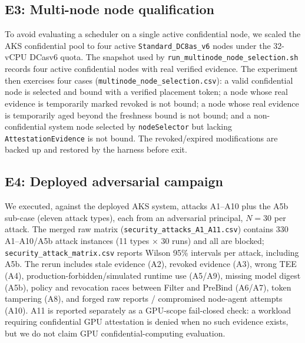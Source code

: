 \subsection{E3: Multi-node node qualification}
\label{sec:e3-multinode}
To avoid evaluating a scheduler on a single active confidential node, we scaled
the AKS confidential pool to four active \texttt{Standard\_DC8as\_v6} nodes under
the 32-vCPU DCasv6 quota. The snapshot used by
\texttt{run\_multinode\_node\_selection.sh} records four active confidential
nodes with real verified evidence. The experiment then exercises four cases
(\texttt{multinode\_node\_selection.csv}): a valid confidential node is selected
and bound with a verified placement token; a node whose real evidence is
temporarily marked revoked is not bound; a node whose real evidence is
temporarily aged beyond the freshness bound is not bound; and a non-confidential
system node selected by \texttt{nodeSelector} but lacking
\texttt{AttestationEvidence} is not bound. The revoked/expired modifications are
backed up and restored by the harness before exit.

\subsection{E4: Deployed adversarial campaign}
\label{sec:e2}
We executed, against the deployed AKS system, attacks A1--A10 plus the A5b
sub-case (eleven attack types), each from an adversarial principal, $N{=}30$
per attack. The merged raw matrix (\texttt{security\_attacks\_A1\_A11.csv})
contains 330 A1--A10/A5b attack instances (11 types $\times$ 30 runs) and all
are blocked; \texttt{security\_attack\_matrix.csv} reports Wilson 95\%
intervals per attack, including A5b. The rerun includes stale evidence (A2), revoked evidence
(A3), wrong TEE (A4), production-forbidden/simulated runtime use (A5/A9), missing
model digest (A5b), policy and revocation races between Filter and PreBind
(A6/A7), token tampering (A8), and forged raw reports / compromised node-agent
attempts (A10). A11 is reported separately as a GPU-scope fail-closed check: a
workload requiring confidential GPU attestation is denied when no such evidence
exists, but we do not claim GPU confidential-computing evaluation.

